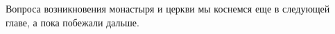 Вопроса возникновения монастыря и церкви мы коснемся еще в следующей главе, а пока побежали дальше.











